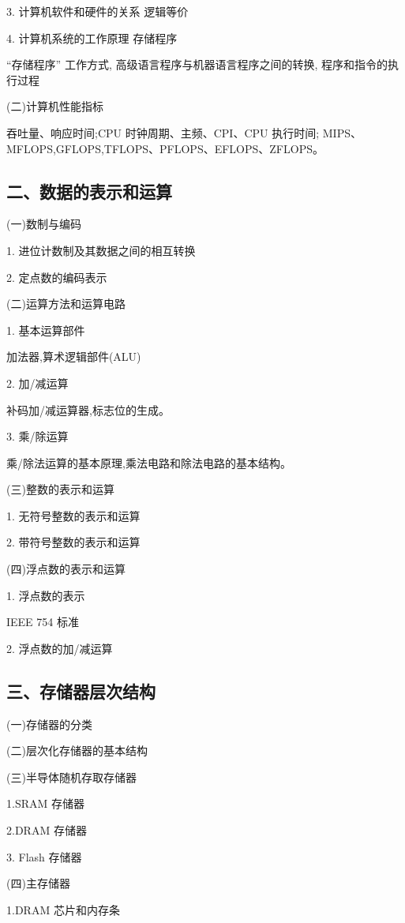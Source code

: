 \documentclass[10pt]{article}
\begin{document}
3. 计算机软件和硬件的关系 逻辑等价

4. 计算机系统的工作原理 存储程序

“存储程序” 工作方式, 高级语言程序与机器语言程序之间的转换, 程序和指令的执行过程

(二)计算机性能指标

吞吐量、响应时间;CPU 时钟周期、主频、CPI、CPU 执行时间;{\color{red} MIPS、MFLOPS,GFLOPS,TFLOPS、PFLOPS、EFLOPS、ZFLOPS}。

\subsection*{二、数据的表示和运算}

(一)数制与编码

1. 进位计数制及其数据之间的相互转换

2. 定点数的编码表示

{\color{red} (二)运算方法和运算电路}

1. 基本运算部件

{\color{red} 加法器,算术逻辑部件(ALU)}

2. 加/减运算

{\color{red}补码加/减运算器,标志位的生成。}

3. 乘/除运算

{\color{red}乘/除法运算的基本原理,乘法电路和除法电路的基本结构。}

(三)整数的表示和运算

1. 无符号整数的表示和运算

2. 带符号整数的表示和运算

(四)浮点数的表示和运算

1. 浮点数的表示

{\color{red} IEEE 754 标准}

2. 浮点数的加/减运算

\subsection*{三、存储器层次结构}

(一)存储器的分类

(二)层次化存储器的基本结构

(三)半导体随机存取存储器

1.SRAM 存储器

2.DRAM 存储器

{\color{red} 3. Flash 存储器}

(四)主存储器

1.DRAM 芯片和内存条
\end{document}
